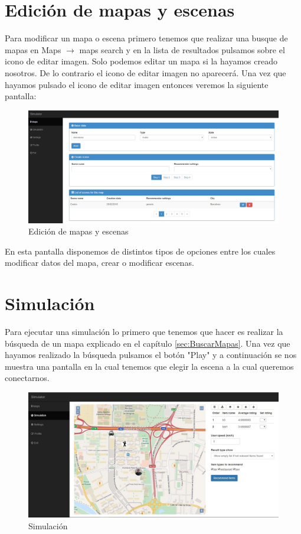 \section{Edición de mapas y escenas}

Para modificar un mapa o escena primero tenemos que realizar una busque de mapas en Maps $\rightarrow$ maps search y en la lista de resultados pulsamos sobre el icono de editar imagen. Solo podemos editar un mapa si la hayamos creado nosotros. De lo contrario el icono de editar imagen no aparecerá. Una vez que hayamos pulsado el icono de editar imagen entonces veremos la siguiente pantalla:

\begin{figure}[H]
	\centering\includegraphics[scale=0.3]{imagenes/capitulo10/capitulo10.jpg}
	\caption{Edición de mapas y escenas}
	\label{img:UpdateMapScene}
\end{figure}

En esta pantalla disponemos de distintos tipos de opciones entre los cuales modificar datos del mapa, crear o modificar escenas.

\newpage

\section{Simulación}

Para ejecutar una simulación lo primero que tenemos que hacer es realizar la búsqueda de un mapa explicado en el capítulo \ref{sec:BuscarMapas}. Una vez que hayamos realizado la búsqueda pulsamos el botón "Play" y a continuación se nos muestra una pantalla en la cual tenemos que elegir la escena a la cual queremos conectarnos.

\begin{figure}[H]
	\centering\includegraphics[scale=0.3]{imagenes/capitulo11/capitulo11.jpg}
	\caption{Simulación}
	\label{img:Simulation}
\end{figure}